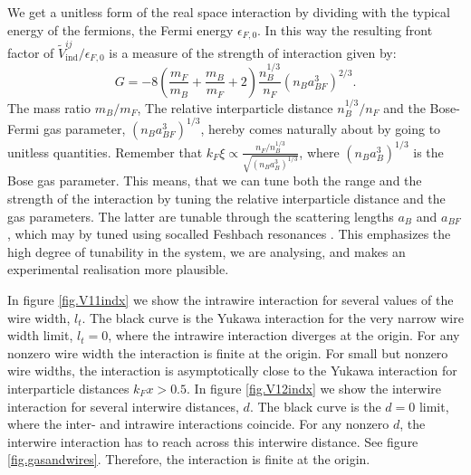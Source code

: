 We get a unitless form of the real space interaction by dividing with the typical energy of the fermions, the Fermi energy $\epsilon_{F,0}$. In this way the resulting front factor of $\tilde{V}^{ij}_{\text{ind}} / \epsilon_{F,0}$ is a measure of the strength of interaction given by:
\begin{equation}
G = - 8\left( \frac{m_F}{m_B} + \frac{m_B}{m_F} + 2 \right) \frac{n_B^{1/3}}{n_F}(n_Ba_{BF}^3)^{2/3}.
\label{eq.interactionstrength.wires}
\end{equation}
The mass ratio $m_B / m_F$, The relative interparticle distance $n_B^{1/3} / n_F$ and the Bose-Fermi gas parameter, $(n_Ba_{BF}^3)^{1/3}$, hereby comes naturally about by going to unitless quantities. Remember that $k_F\xi \propto \frac{n_F /  n_B^{1/3} }{ \sqrt{ (n_Ba_B^3)^{1/3} } }$, where $(n_Ba_B^3)^{1/3}$ is the Bose gas parameter. This means, that we can tune both the range and the strength of the interaction by tuning the relative interparticle distance and the gas parameters. The latter are tunable through the scattering lengths $a_B$ and $a_{BF}$, which may by tuned using socalled Feshbach resonances \cite[pp. 143-151]{Pethick}. This emphasizes the high degree of tunability in the system, we are analysing, and makes an experimental realisation more plausible. 

In figure \ref{fig.V11indx} we show the intrawire interaction for several values of the wire width, $l_t$. The black curve is the Yukawa interaction for the very narrow wire width limit, $l_t = 0$, where the intrawire interaction diverges at the origin. For any nonzero wire width the interaction is finite at the origin. For small but nonzero wire widths, the interaction is asymptotically close to the Yukawa interaction for interparticle distances $k_Fx > 0.5$. In figure \ref{fig.V12indx} we show the interwire interaction for several interwire distances, $d$. The black curve is the $d = 0$ limit, where the inter- and intrawire interactions coincide. For any nonzero $d$, the interwire interaction has to reach across this interwire distance. See figure \ref{fig.gasandwires}. Therefore, the interaction is finite at the origin. 

